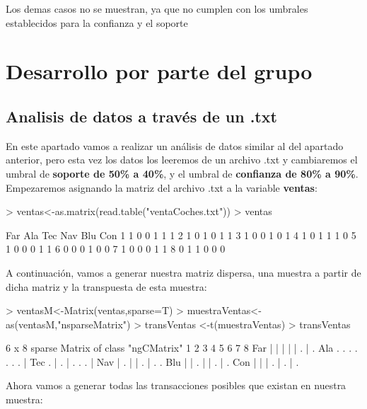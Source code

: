 \documentclass [a4paper] {article}
\begin{document}
Los demas casos no se muestran, ya que no cumplen con los umbrales establecidos para la confianza y el
soporte


\section{Desarrollo por parte del grupo}

\subsection{Analisis de datos a través de un .txt}
En este apartado vamos a realizar un análisis de datos similar al 
del apartado anterior, pero esta vez los datos los leeremos de 
un archivo .txt y cambiaremos el umbral de \textbf{soporte de 50\% a 40\%}, 
y el umbral de \textbf{confianza de 80\% a 90\%}.\\
Empezaremos asignando la matriz del archivo .txt a 
la variable \textbf{ventas}:

\begin{Schunk}
\begin{Sinput}
> ventas<-as.matrix(read.table("ventaCoches.txt"))
> ventas
\end{Sinput}
\begin{Soutput}
  Far Ala Tec Nav Blu Con
1   1   0   0   1   1   1
2   1   0   1   0   1   1
3   1   0   0   1   0   1
4   1   0   1   1   1   0
5   1   0   0   0   1   1
6   0   0   0   1   0   0
7   1   0   0   0   1   1
8   0   1   1   0   0   0
\end{Soutput}
\end{Schunk}

A continuación, vamos a generar nuestra matriz dispersa, una muestra a partir de dicha matriz y la transpuesta de esta muestra:

\begin{Schunk}
\begin{Sinput}
> ventasM<-Matrix(ventas,sparse=T)
> muestraVentas<-as(ventasM,"nsparseMatrix")
> transVentas <-t(muestraVentas)
> transVentas
\end{Sinput}
\begin{Soutput}
6 x 8 sparse Matrix of class "ngCMatrix"
    1 2 3 4 5 6 7 8
Far | | | | | . | .
Ala . . . . . . . |
Tec . | . | . . . |
Nav | . | | . | . .
Blu | | . | | . | .
Con | | | . | . | .
\end{Soutput}
\end{Schunk}

Ahora vamos a generar todas las transacciones posibles que
existan en nuestra muestra:
\end{document}
